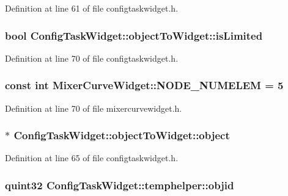 Definition at line 61 of file configtaskwidget.\-h.

\hypertarget{group___u_a_v_object_widget_utils_ga22163ec4275b9b06770d4caead750ee4}{
\subsubsection[{is\-Limited}]{\setlength{\rightskip}{0pt plus 5cm}bool Config\-Task\-Widget\-::object\-To\-Widget\-::is\-Limited}}\label{group___u_a_v_object_widget_utils_ga22163ec4275b9b06770d4caead750ee4}


Definition at line 70 of file configtaskwidget.\-h.

\hypertarget{group___u_a_v_object_widget_utils_ga359d5a2efb6966cba1d78bbdb2e7759d}{
\subsubsection[{N\-O\-D\-E\-\_\-\-N\-U\-M\-E\-L\-E\-M}]{\setlength{\rightskip}{0pt plus 5cm}const {\bf int} Mixer\-Curve\-Widget\-::\-N\-O\-D\-E\-\_\-\-N\-U\-M\-E\-L\-E\-M = 5\hspace{0.3cm}{\ttfamily [static]}}}\label{group___u_a_v_object_widget_utils_ga359d5a2efb6966cba1d78bbdb2e7759d}


Definition at line 70 of file mixercurvewidget.\-h.

\hypertarget{group___u_a_v_object_widget_utils_ga0a7a2adb310cdc6b0301dfad762a4f30}{
\subsubsection[{object}]{$\ast$ Config\-Task\-Widget\-::object\-To\-Widget\-::object}}\label{group___u_a_v_object_widget_utils_ga0a7a2adb310cdc6b0301dfad762a4f30}


Definition at line 65 of file configtaskwidget.\-h.

\hypertarget{group___u_a_v_object_widget_utils_ga4c750b1bce138cf6e002f73fca580c4d}{
\subsubsection[{objid}]{\setlength{\rightskip}{0pt plus 5cm}quint32 Config\-Task\-Widget\-::temphelper\-::objid}}\label{group___u_a_v_object_widget_utils_ga4c750b1bce138cf6e002f73fca580c4d}


